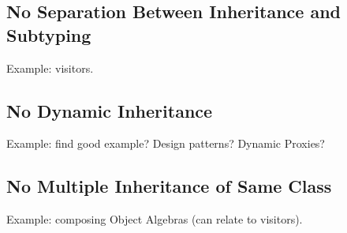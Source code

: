 
\subsection{No Separation Between Inheritance and Subtyping}

Example: visitors.



\subsection{No Dynamic Inheritance}

Example: find good example? Design patterns? Dynamic Proxies?


\subsection{No Multiple Inheritance of Same Class}

Example: composing Object Algebras (can relate to visitors).


